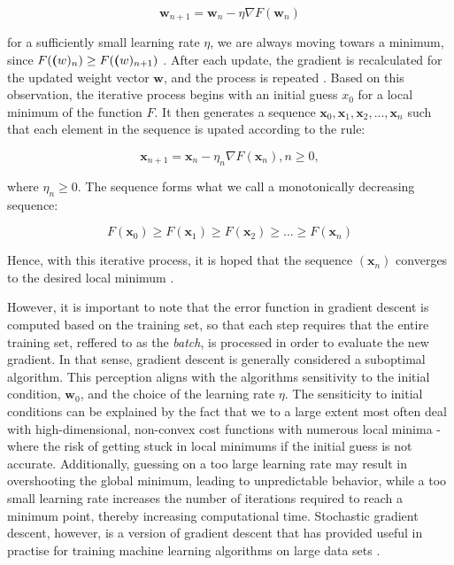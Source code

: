 \documentclass[a4paper, UKenglish, 11pt]{uiomaster}
\begin{document}
\begin{equation}
\textbf{w}_{n+1} = \textbf{w}_n - \eta\nabla F(\textbf{w}_n)
\end{equation}

for a sufficiently small learning rate $\eta$, we are always moving towars a minimum, since $F(\textbf(w)_n) \ge F(\textbf(w)_{n+1})$ \cite{wiki-gradient-descent}. After each update, the gradient is recalculated for the updated weight vector $\textbf{w}$, and the process is repeated \cite{bishop2006pattern}. Based on this observation, the iterative process begins with an initial guess $x_0$ for a local minimum of the function $F$. It then generates a sequence $\textbf{x}_0, \textbf{x}_1, \textbf{x}_2, ..., \textbf{x}_n$ such that each element in the sequence is upated according to the rule:

\begin{equation}
\textbf{x}_{n+1} = \textbf{x}_{n} - \eta_n\nabla F(\textbf{x}_n), n \ge 0,
\end{equation}

where $\eta_n \ge 0$. The sequence forms what we call a monotonically decreasing sequence:

\begin{equation}
F(\textbf{x}_0) \ge F(\textbf{x}_1) \ge F(\textbf{x}_2) \ge ... \ge F(\textbf{x}_n)
\end{equation}

Hence, with this iterative process, it is hoped that the sequence $(\textbf{x}_n)$ converges to the desired local minimum \cite{wiki-gradient-descent}.

However, it is important to note that the error function in gradient descent is computed based on the training set, so that each step requires that the entire training set, reffered to as the \emph{batch}, is processed in order to evaluate the new gradient. In that sense, gradient descent is generally considered a suboptimal algorithm. This perception aligns with the algorithms sensitivity to the initial condition, $\textbf{w}_0$, and the choice of the learning rate $\eta$. The sensiticity to initial conditions can be explained by the fact that we to a large extent most often deal with high-dimensional, non-convex cost functions with numerous local minima - where the risk of getting stuck in local minimums if the initial guess is not accurate. Additionally, guessing on a too large learning rate may result in overshooting the global minimum, leading to unpredictable behavior, while a too small learning rate increases the number of iterations required to reach a minimum point, thereby increasing computational time. Stochastic gradient descent, however, is a version of gradient descent that has provided useful in practise for training machine learning algorithms on large data sets \cite{bishop2006pattern}.
\end{document}
